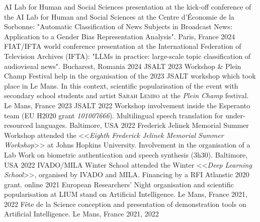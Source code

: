\begin{absolutelynopagebreak}
\begin{cvhonors}
  \cvhonor
	{AI Lab for Human and Social Sciences}
    {presentation at the kick-off conference of the AI Lab for Human and Social Sciences at the Centre d'Économie de la Sorbonne: "Automatic Classification of News Subjects in Broadcast News: Application to a Gender Bias Representation Analysis".}
    {Paris, France}
    {2024}
  \cvhonor
    {FIAT/IFTA world conference}
    {presentation at the International Federation of Television Archives (IFTA): "LLMs in practice: large-scale topic classification of audiovisual news".}
    {Bucharest, Romania}
    {2024}
  \cvhonor
    {JSALT 2023 Workshop \& Plein Champ Festival}
    {help in the organisation of the 2023 JSALT workshop which took place in Le Mans. In this context, scientific popularisation of the event with secondary school students and artist \textsc{Sarah Lembo} at the \textit{Plein Champ} festival.}
    {Le Mans, France}
    {2023}
 \cvhonor
    {JSALT 2022 Workshop}
    {involvement inside the Esperanto team (EU H2020 grant \textit{101007666}). Multilingual speech translation for under-resourced languages.}
    {Baltimore, USA}
    {2022}
  \cvhonor
    {Frederick Jelinek Memorial Summer Workshop}
    {attended the <<\textit{Eighth Frederick Jelinek Memorial Summer Workshop}>> at Johns Hopkins University. Involvement in the organisation of a Lab Work on biometric authentication and speech synthesis (3h30).}
    {Baltimore, USA}
    {2022}
  \cvhonor
    {IVADO/MILA Winter School}
    {attended the Winter <<\textit{Deep Learning School}>>, organised by IVADO and MILA. Financing by a RFI Atlanstic 2020 grant.}
    {online}
    {2021}
\cvhonor
    {European Researchers' Night}
    {organisation and scientific popularisation at LIUM stand on Artificial Intelligence.}
    {Le Mans, France}
    {2021, 2022}
\cvhonor
    {Fête de la Science}
    {conception and presentation of demonstration tools on Artificial Intelligence.}
    {Le Mans, France}
    {2021, 2022}
\end{cvhonors}
\end{absolutelynopagebreak}
